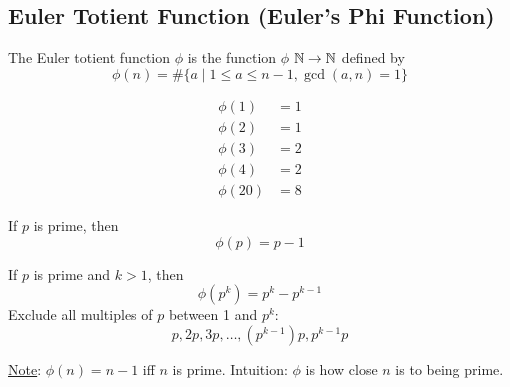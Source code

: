     \subsection{Euler Totient Function (Euler's Phi Function)}
    \begin{definition}
        The Euler totient function $\phi$ is 
        the function $\phi$ $\mathbb{N}\rightarrow\mathbb{N}$ defined by 
        \[ 
            \phi(n) = \#\{ a\mid 1\le a\le n-1, \gcd(a,n)=1 \} 
        \]
        \begin{example}
            \begin{align*}
                \phi(1) &= 1 \\
                \phi(2) &= 1 \\
                \phi(3) &= 2 \\
                \phi(4) &= 2 \\
                \phi(20) &= 8
            \end{align*}
        \end{example}

        \begin{proposition}
            If $p$ is prime, then
            \[ \phi(p) = p-1 \]
        \end{proposition}

        \begin{proposition}
            If $p$ is prime and $k>1$, then
            \[ \phi(p^k) = p^k-p^{k-1} \]
            Exclude all multiples of $p$ between 1 and $p^k$:
            \[ p,2p,3p,\dots,(p^{k-1})p,p^{k-1}p \]
        \end{proposition}

        \underline{Note}: $\phi(n)=n-1$ iff $n$ is prime.
        Intuition: $\phi$ is how close $n$ is to being prime.
    \end{definition}

